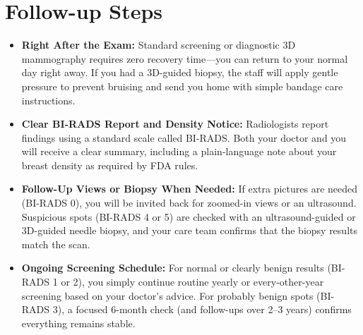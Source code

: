 \section{Follow-up Steps}
\begin{itemize}
\item \textbf{Right After the Exam:} Standard screening or diagnostic 3D mammography requires zero recovery time---you can return to your normal day right away. If you had a 3D-guided biopsy, the staff will apply gentle pressure to prevent bruising and send you home with simple bandage care instructions.
\item \textbf{Clear BI-RADS Report and Density Notice:} Radiologists report findings using a standard scale called BI-RADS. Both your doctor and you will receive a clear summary, including a plain-language note about your breast density as required by FDA rules.
\item \textbf{Follow-Up Views or Biopsy When Needed:} If extra pictures are needed (BI-RADS 0), you will be invited back for zoomed-in views or an ultrasound. Suspicious spots (BI-RADS 4 or 5) are checked with an ultrasound-guided or 3D-guided needle biopsy, and your care team confirms that the biopsy results match the scan.
\item \textbf{Ongoing Screening Schedule:} For normal or clearly benign results (BI-RADS 1 or 2), you simply continue routine yearly or every-other-year screening based on your doctor's advice. For probably benign spots (BI-RADS 3), a focused 6-month check (and follow-ups over 2--3 years) confirms everything remains stable.
\end{itemize}

